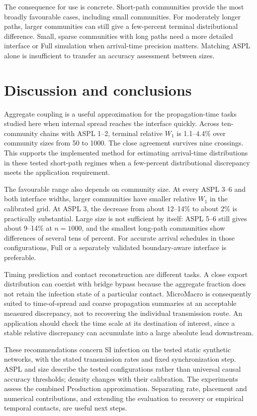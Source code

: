\documentclass[a4paper,fleqn]{cas-sc}
\begin{document}
The consequence for use is concrete. Short-path communities provide the most broadly favourable cases, including small communities. For moderately longer paths, larger communities can still give a few-percent terminal distributional difference. Small, sparse communities with long paths need a more detailed interface or Full simulation when arrival-time precision matters. Matching ASPL alone is insufficient to transfer an accuracy assessment between sizes.

\section{Discussion and conclusions}

Aggregate coupling is a useful approximation for the propagation-time tasks studied here when internal spread reaches the interface quickly. Across ten-community chains with ASPL 1--2, terminal relative $W_1$ is 1.1--4.4\% over community sizes from 50 to 1000. The close agreement survives nine crossings. This supports the implemented method for estimating arrival-time distributions in these tested short-path regimes when a few-percent distributional discrepancy meets the application requirement.

The favourable range also depends on community size. At every ASPL 3--6 and both interface widths, larger communities have smaller relative $W_1$ in the calibrated grid. At ASPL 3, the decrease from about 12--14\% to about 2\% is practically substantial. Large size is not sufficient by itself: ASPL 5--6 still gives about 9--14\% at $n=1000$, and the smallest long-path communities show differences of several tens of percent. For accurate arrival schedules in those configurations, Full or a separately validated boundary-aware interface is preferable.

Timing prediction and contact reconstruction are different tasks. A close export distribution can coexist with bridge bypass because the aggregate fraction does not retain the infection state of a particular contact. MicroMacro is consequently suited to time-of-spread and coarse propagation summaries at an acceptable measured discrepancy, not to recovering the individual transmission route. An application should check the time scale at its destination of interest, since a stable relative discrepancy can accumulate into a large absolute lead downstream.

These recommendations concern SI infection on the tested static synthetic networks, with the stated transmission rates and fixed synchronization step. ASPL and size describe the tested configurations rather than universal causal accuracy thresholds; density changes with their calibration. The experiments assess the combined Production approximation. Separating rate, placement and numerical contributions, and extending the evaluation to recovery or empirical temporal contacts, are useful next steps.
\end{document}

